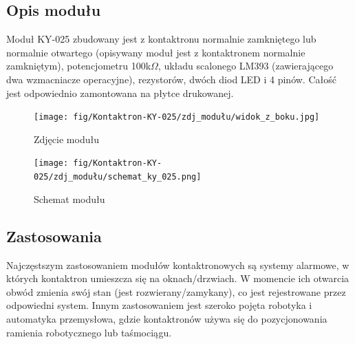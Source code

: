 \documentclass[11pt, a4paper]{article}
\begin{document}
\subsection{Opis modułu}
Moduł KY-025 zbudowany jest z kontaktronu normalnie zamkniętego lub normalnie otwartego (opisywany moduł jest z kontaktronem normalnie zamkniętym), potencjometru 100k$\Omega$, układu scalonego LM393 (zawierającego dwa wzmacniacze operacyjne), rezystorów, dwóch diod LED i 4 pinów. Całość jest odpowiednio zamontowana na płytce drukowanej. 
\vspace{0.1cm}
\begin{figure}[H]
\centering
  \texttt{[image: fig/Kontaktron-KY-025/zdj\_modułu/widok\_z\_boku.jpg]}
  \caption{Zdjęcie modułu}
  \label{fig:sub1}
\end{figure}
\vspace{0.1cm}
\vspace{0.1cm}
\begin{figure}[H]
\centering
  \texttt{[image: fig/Kontaktron-KY-025/zdj\_modułu/schemat\_ky\_025.png]}
  \caption{Schemat modułu}
  \label{fig:sub2}
\end{figure}
\vspace{0.1cm}

\subsection{Zastosowania}
Najczęstszym zastosowaniem modułów kontaktronowych są systemy alarmowe, w których kontaktron umieszcza się na oknach/drzwiach. W momencie ich otwarcia obwód zmienia swój stan (jest rozwierany/zamykany), co jest rejestrowane przez odpowiedni system. Innym zastosowaniem jest szeroko pojęta robotyka i automatyka przemysłowa, gdzie kontaktronów używa się do pozycjonowania ramienia robotycznego lub taśmociągu.


\newpage
{}
\end{document}

